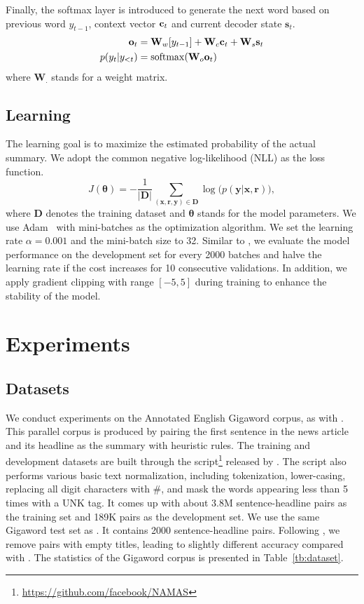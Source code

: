 \documentclass[letterpaper]{article} %
\begin{document}
	Finally, the softmax layer is introduced to generate the next word based on previous word $y_{t-1}$, context vector ${\bf{c}}_t$ and current decoder state $\mathbf{s}_t$.
	\begin{align}
		{{\bf{o}}_t} &= {{\bf{W}}_w}[{y_{t - 1}}] + {{\bf{W}}_c}{{\bf{c}}_t} + {{\bf{W}}_s}{{\bf{s}}_t} \\
		p({y_t}|{y_{<t}}) &= {\rm{softmax}}({{\bf{W}}_o}{{\bf{o}}_t})
	\end{align}
	where $\mathbf{W}_.$ stands for a weight matrix.
	
	\subsection{Learning}
	The learning goal is to maximize the estimated probability of the actual summary. 
	We adopt the common negative log-likelihood (NLL) as the loss function.
	\begin{equation}
		J(\mathbf{\theta} ) =  - \frac{1}{{|{\mathbf{D}}|}}\sum\limits_{({\mathbf{x}},{\mathbf{r}},{\mathbf{y}}) \in {\mathbf{D}}} {\log (p({\mathbf{y}}|{\mathbf{x}},{\mathbf{r}})} ),
	\end{equation}
	where $\mathbf{D}$ denotes the training dataset and $\mathbf{\theta}$ stands for the model parameters.
	We use Adam~\cite{kingma2014adam} with mini-batches as the optimization algorithm. 
	We set the learning rate $\alpha=0.001$ and the mini-batch size to 32.
	Similar to \cite{zhou2017selective}, we evaluate the model performance on the development set for every 2000 batches and halve the learning rate if the cost increases for 10 consecutive validations. 
	In addition, we apply gradient clipping \cite{pascanu2013difficulty} with range $[-5,5]$ during training to enhance the stability of the model.
	
	
	\section{Experiments}
	\subsection{Datasets}
	We conduct experiments on the Annotated English Gigaword corpus, as with \cite{rush-chopra-weston:2015:EMNLP}.
	This parallel corpus is produced by pairing the first sentence in the news article and its headline as the summary with heuristic rules.
	The training and development datasets are built through the script\footnote{\url{https://github.com/facebook/NAMAS}} released
	by \cite{rush-chopra-weston:2015:EMNLP}. 
	The script also performs various basic text normalization, including tokenization, lower-casing, replacing all digit characters with \#, and mask the words appearing less than 5 times with a UNK tag. 
	It comes up with about 3.8M sentence-headline pairs as the training set and 189K pairs as the development set.
	We use the same Gigaword test set as \cite{rush-chopra-weston:2015:EMNLP}.
	It contains 2000 sentence-headline pairs.
	Following \cite{rush2015neural}, we remove pairs with empty titles, leading to slightly different accuracy compared with \cite{rush-chopra-weston:2015:EMNLP}. 
	The statistics of the Gigaword corpus is presented in Table~\ref{tb:dataset}.
	
\end{document}
